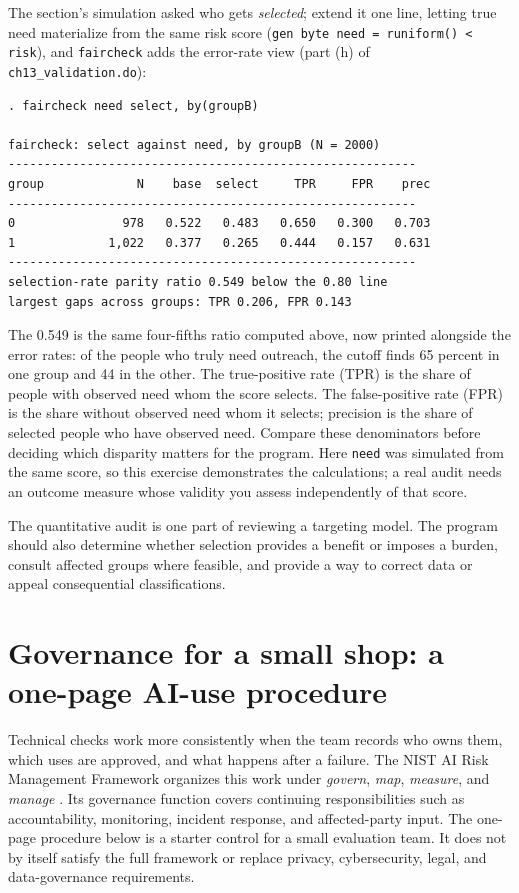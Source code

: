 \documentclass[
    a4paper,
    fontsize=10pt,
    twoside=true,
    numbers=noenddot,
]{kaobook}
\begin{document}
The section's simulation asked who gets \emph{selected}; extend it one line, letting true need materialize from the same risk score (\texttt{gen byte need = runiform() < risk}), and \texttt{faircheck} adds the error-rate view (part (h) of \texttt{ch13\_validation.do}):
\par
{\footnotesize
\begin{verbatim}
. faircheck need select, by(groupB)

faircheck: select against need, by groupB (N = 2000)
---------------------------------------------------------
group             N    base  select     TPR     FPR    prec
---------------------------------------------------------
0               978   0.522   0.483   0.650   0.300   0.703
1             1,022   0.377   0.265   0.444   0.157   0.631
---------------------------------------------------------
selection-rate parity ratio 0.549 below the 0.80 line
largest gaps across groups: TPR 0.206, FPR 0.143
\end{verbatim}
}
The 0.549 is the same four-fifths ratio computed above, now printed alongside the error rates: of the people who truly need outreach, the cutoff finds 65 percent in one group and 44 in the other. The true-positive rate (TPR) is the share of people with observed need whom the score selects. The false-positive rate (FPR) is the share without observed need whom it selects; precision is the share of selected people who have observed need. Compare these denominators before deciding which disparity matters for the program. Here \texttt{need} was simulated from the same score, so this exercise demonstrates the calculations; a real audit needs an outcome measure whose validity you assess independently of that score.

The quantitative audit is one part of reviewing a targeting model. The program should also determine whether selection provides a benefit or imposes a burden, consult affected groups where feasible, and provide a way to correct data or appeal consequential classifications.

\section{Governance for a small shop: a one-page AI-use procedure}\label{sec:ch13-governance}
Technical checks work more consistently when the team records who owns them, which uses are approved, and what happens after a failure. The NIST AI Risk Management Framework organizes this work under \emph{govern}, \emph{map}, \emph{measure}, and \emph{manage} \parencite{tabassi2023airmf}. Its governance function covers continuing responsibilities such as accountability, monitoring, incident response, and affected-party input. The one-page procedure below is a starter control for a small evaluation team. It does not by itself satisfy the full framework or replace privacy, cybersecurity, legal, and data-governance requirements.
\end{document}
